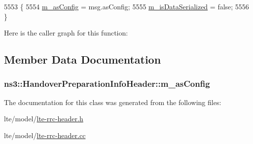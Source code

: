 \begin{DoxyCode}
5553 \{
5554   \hyperlink{classns3_1_1HandoverPreparationInfoHeader_adfafc689e36800c0c59d495f74e3bdc1}{m\_asConfig} = msg.asConfig;
5555   \hyperlink{classns3_1_1Asn1Header_ae39d42f09e8ec85d8180843625fc92ba}{m\_isDataSerialized} = \textcolor{keyword}{false};
5556 \}
\end{DoxyCode}


Here is the caller graph for this function\+:




\subsection{Member Data Documentation}
\subsubsection[{\texorpdfstring{m\+\_\+as\+Config}{m_asConfig}}]{ ns3\+::\+Handover\+Preparation\+Info\+Header\+::m\+\_\+as\+Config\hspace{0.3cm}{\ttfamily [private]}}\hypertarget{classns3_1_1HandoverPreparationInfoHeader_adfafc689e36800c0c59d495f74e3bdc1}{}\label{classns3_1_1HandoverPreparationInfoHeader_adfafc689e36800c0c59d495f74e3bdc1}


The documentation for this class was generated from the following files\+:\begin{DoxyCompactItemize}
\item 
lte/model/\hyperlink{lte-rrc-header_8h}{lte-\/rrc-\/header.\+h}\item 
lte/model/\hyperlink{lte-rrc-header_8cc}{lte-\/rrc-\/header.\+cc}\end{DoxyCompactItemize}
